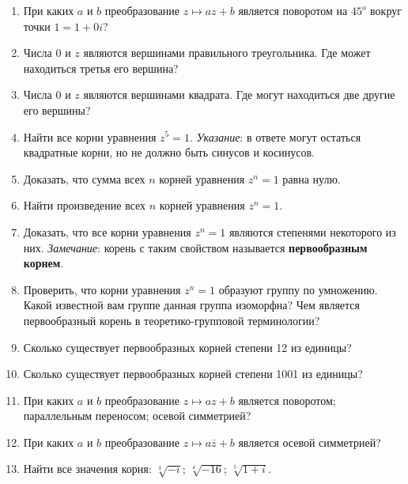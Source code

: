 \begin{enumerate}
\item При каких $a$ и $b$ преобразование $z \mapsto az + b$ является поворотом
 на $45^o$ вокруг точки $1 = 1 + 0i$?
\item Числа $0$ и $z$ являются вершинами правильного треугольника.
 Где может находиться третья его вершина?
\item Числа $0$ и $z$ являются вершинами квадрата. Где могут находиться две другие его вершины?
\item Найти все корни уравнения $z^5 = 1$. \textit{Указание}: в ответе могут
остаться квадратные корни, но не должно быть синусов и косинусов.
\item Доказать, что сумма всех $n$ корней уравнения $z^n = 1$ равна нулю.
\item Найти произведение всех $n$ корней уравнения $z^n = 1$.
\item Доказать, что все корни уравнения $z^n = 1$ являются степенями некоторого из них.
\textit{Замечание}: корень с таким свойством называется \textbf{первообразным корнем}.
\item Проверить, что корни уравнения $z^n=1$ образуют группу по умножению. Какой известной вам группе данная группа изоморфна? Чем является первообразный корень в теоретико-групповой терминологии?
\item Сколько существует первообразных корней степени 12 из единицы?
\item Сколько существует первообразных корней степени 1001 из единицы?
\item При каких $a$ и $b$ преобразование $z \mapsto az + b$ является
\ipunkt поворотом;
\ipunkt параллельным переносом;
\ipunkt осевой симметрией?
\item При каких $a$ и $b$ преобразование $z \mapsto a \bar z + b$ является осевой
симметрией?
\item Найти все значения корня: \ipunkt $\sqrt[3]{-i}$; \ipunkt $\sqrt[4]{-16}$; \ipunkt $\sqrt[5]{1+i}$.

\end{enumerate}

